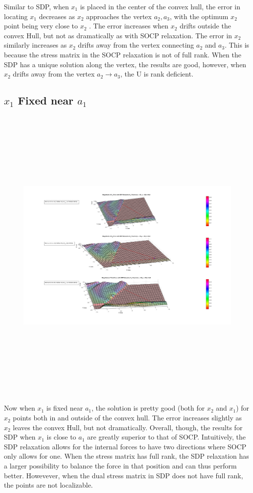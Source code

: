 \documentclass{article} %
\begin{document}
\begin{itemize}
Similar to SDP, when $x_1$ is placed in the center of the convex hull, the error in locating $x_1$ decreases as $x_2$ approaches the vertex $a_2,a_3$, with the optimum $x_2$ point being very close to $x_2$ . The error increases when $x_2$ drifts outside the convex Hull, but not as dramatically as with SOCP relaxation. The error in $x_2$ similarly increases as $x_2$ drifts away from the vertex connecting $a_2$ and $a_3$. This is because the stress matrix in the SOCP relaxation is not of full rank. When the SDP has a unique solution along the vertex, the results are good, however, when $x_2$ drifts away from the vertex $a_2 \rightarrow a_3$, the U is rank deficient. 

\subsection*{$x_1$ Fixed near $a_1$}


\begin{figure}[H]
\centering
\includegraphics[width=\textwidth,height=15cm]{SDPNEAR1.png}
\end{figure}

Now when $x_1$ is fixed near $a_1$, the solution is pretty good (both for $x_2$ and $x_1$) for $x_2$ points both in and outside of the convex hull. The error increases slightly as $x_2$ leaves the convex Hull, but not dramatically. Overall, though, the results for SDP when $x_1$ is close to $a_1$ are greatly superior to that of SOCP. Intuitively, the SDP relaxation allows for the internal forces to have two directions where SOCP only allows for one. When the stress matrix has full rank, the SDP relaxation has a larger possibility to balance the force in that position and can thus perform better. Howevever, when the dual stress matrix in SDP does not have full rank, the points are not localizable. 




\end{itemize}
\end{document}
